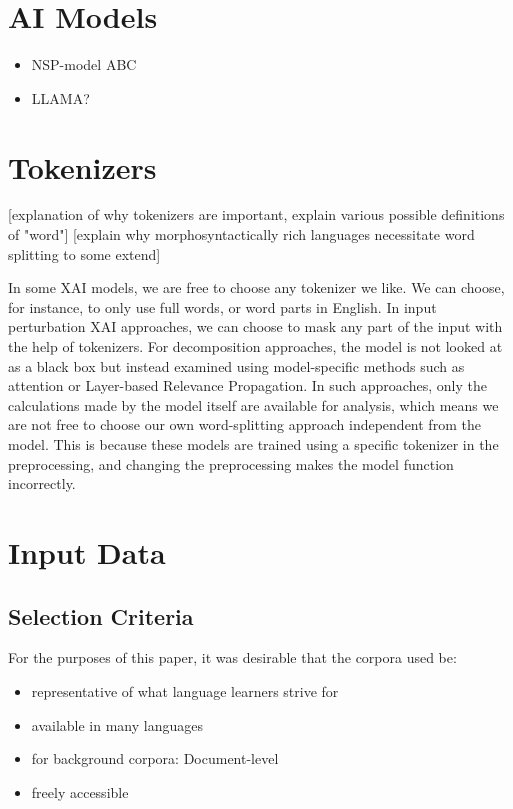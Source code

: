 \section{AI Models}
\begin{itemize}
	\item NSP-model ABC
	\item LLAMA?
\end{itemize}


\section{Tokenizers}
[explanation of why tokenizers are important, explain various possible definitions of "word"]
[explain why morphosyntactically rich languages necessitate word splitting to some extend]

In some XAI models, we are free to choose any tokenizer we like.
We can choose, for instance, to only use full words, or word parts in English.
In input perturbation XAI approaches, we can choose to mask any part of the input with the help of tokenizers.
For decomposition approaches, the model is not looked at as a black box but instead examined using model-specific methods such as attention or Layer-based Relevance Propagation.
In such approaches, only the calculations made by the model itself are available for analysis, which means we are not free to choose our own word-splitting approach independent from the model.
This is because these models are trained using a specific tokenizer in the preprocessing, and changing the preprocessing makes the model function incorrectly.



\section{Input Data}
\subsection{Selection Criteria}

For the purposes of this paper, it was desirable that the corpora used be:
\begin{itemize}
    \item representative of what language learners strive for
    \item available in many languages
    \item for background corpora: Document-level
    \item freely accessible
\end{itemize}

